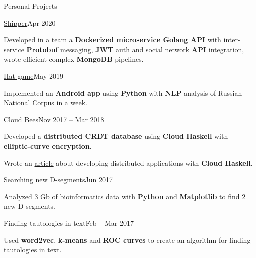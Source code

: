 \documentclass{resume} %
\begin{document}
\begin{rSection}{Personal Projects}
    \begin{rSubsection}{\href{https://gitlab.com/shipr1505/backend}{Shipper}}{Apr 2020}{}{}
    \item Developed in a team a \textbf{Dockerized microservice Golang API} with inter-service \textbf{Protobuf} messaging, \textbf{JWT} auth and social network \textbf{API} integration, wrote efficient complex \textbf{MongoDB} pipelines.
    \end{rSubsection}

    \begin{rSubsection}{\href{https://gitlab.com/SenchoPens/hatapp}{Hat game}}{May 2019}{}{}
    \item Implemented an \textbf{Android app} using \textbf{Python} with \textbf{NLP} analysis of Russian National Corpus in a week.
    \end{rSubsection}

    \begin{rSubsection}{\href{https://github.com/SenchoPens/cloud-bees}{Cloud Bees}}{Nov 2017 -- Mar 2018}{}{}
    \item Developed a \textbf{distributed CRDT database} using \textbf{Cloud Haskell} with \textbf{elliptic-curve encryption}.
    \item Wrote an \href{https://github.com/mreluzeon/block-monad}{article} about developing distributed applications with \textbf{Cloud Haskell}.
    \end{rSubsection}

    \begin{rSubsection}{\href{https://github.com/SenchoPens/bioinformatic}{Searching new D-segments}}{Jun 2017}{}{}
    \item Analyzed 3 Gb of bioinformatics data with \textbf{Python} and \textbf{Matplotlib} to find 2 new D-segments.
    \end{rSubsection}

    \begin{rSubsection}{Finding tautologies in text}{Feb -- Mar 2017}{}{}
    \item Used \textbf{word2vec}, \textbf{k-means} and \textbf{ROC curves} to create an algorithm for finding tautologies in text.
    \end{rSubsection}
\end{rSection}

\end{document}
